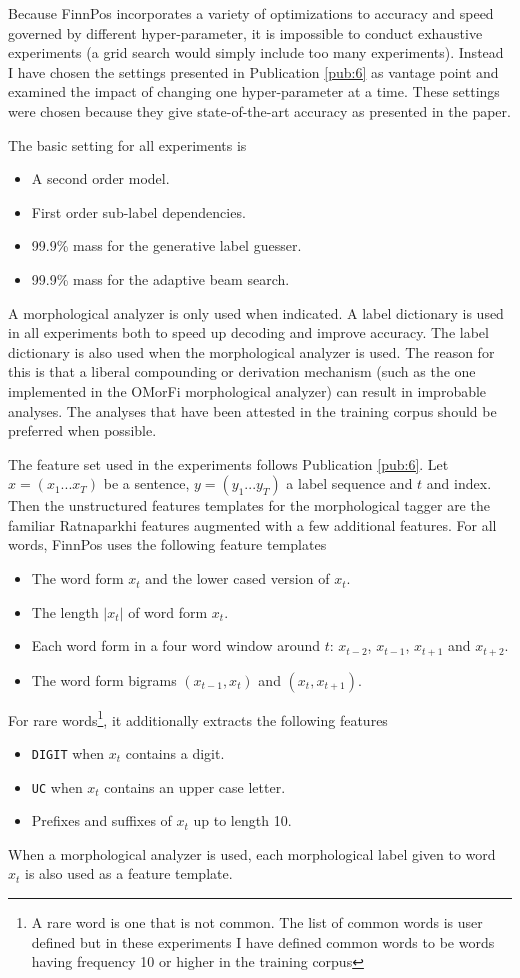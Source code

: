 Because FinnPos incorporates a variety of optimizations to accuracy
and speed governed by different hyper-parameter, it is impossible to
conduct exhaustive experiments (a grid search would simply include too
many experiments). Instead I have chosen the settings presented in
Publication \ref{pub:6} as vantage point and examined the impact of
changing one hyper-parameter at a time. These settings were chosen
because they give state-of-the-art accuracy as presented in the paper.

The basic setting for all experiments is 
\begin{itemize}
\item A second order model.
\item First order sub-label dependencies.
\item 99.9\% mass for the generative label guesser.
\item 99.9\% mass for the adaptive beam search.
\end{itemize}

A morphological analyzer is only used when indicated. A label
dictionary is used in all experiments both to speed up decoding and
improve accuracy. The label dictionary is also used when the
morphological analyzer is used. The reason for this is that a liberal
compounding or derivation mechanism (such as the one implemented in
the OMorFi morphological analyzer) can result in improbable
analyses. The analyses that have been attested in the training corpus
should be preferred when possible.

The feature set used in the experiments follows Publication
\ref{pub:6}.  Let $x = (x_1 ... x_T)$ be a sentence, $y = (y_1
... y_T)$ a label sequence and $t$ and index. Then the unstructured
features templates for the morphological tagger are the familiar
Ratnaparkhi features \citep{Ratnaparkhi1998} augmented with a few
additional features. For all words, FinnPos uses the following feature
templates
\begin{itemize}
\item The word form $x_t$ and the lower cased version of $x_t$.
\item The length $|x_t|$ of word form $x_t$.
\item Each word form in a four word window around $t$: $x_{t-2}$, $x_{t-1}$, $x_{t+1}$ and $x_{t+2}$.
\item The word form bigrams $(x_{t-1}, x_t)$ and $(x_t,x_{t+1})$.
\end{itemize}
For rare words\footnote{A rare word is one that is not common. The
  list of common words is user defined but in these experiments I have
  defined common words to be words having frequency 10 or higher in
  the training corpus}, it additionally extracts the following
features
\begin{itemize}
\item {\tt DIGIT} when $x_t$ contains a digit.
\item {\tt UC} when $x_t$ contains an upper case letter.
\item Prefixes and suffixes of $x_t$ up to length 10.
\end{itemize}
When a morphological analyzer is used, each morphological label given
to word $x_t$ is also used as a feature template.

